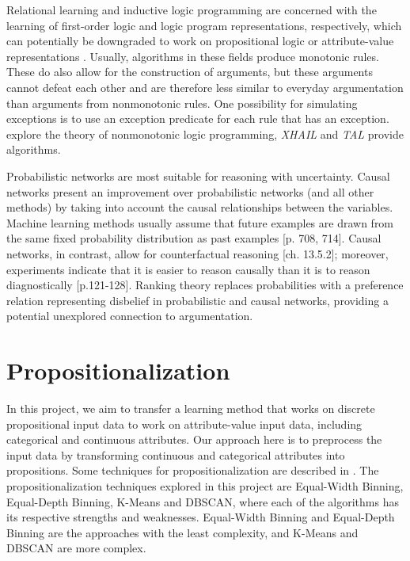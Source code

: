 Relational learning and inductive logic programming are concerned with the learning of first-order logic and logic program representations, respectively, which can potentially be downgraded to work on propositional logic or attribute-value representations \citep{deraedtLogicalRelationalLearning2008}. Usually, algorithms in these fields produce monotonic rules. These do also allow for the construction of arguments, but these arguments cannot defeat each other and are therefore less similar to everyday argumentation than arguments from nonmonotonic rules. One possibility for simulating exceptions is to use an exception predicate for each rule that has an exception. \cite{dimopoulosLearningNonmonotonicLogic1995} explore the theory of nonmonotonic logic programming, \textit{XHAIL} \citep{rayInferringProcessModels2007} and \textit{TAL} \citep{corapiInductiveLogicProgramming2010} provide algorithms.

Probabilistic networks are most suitable for reasoning with uncertainty. Causal networks present an improvement over probabilistic networks (and all other methods) by taking into account the causal relationships between the variables. Machine learning methods usually assume that future examples are drawn from the same fixed probability distribution as past examples \citep{russellArtificialIntelligenceModern2010}[p. 708, 714]. Causal networks, in contrast, allow for counterfactual reasoning \citep{russellArtificialIntelligenceModern2020}[ch. 13.5.2]; moreover, experiments indicate that it is easier to reason causally than it is to reason diagnostically \citep{kahnemanJudgmentUncertaintyHeuristics1982}[p.121-128]. Ranking theory \citep{spohnLawsBeliefRanking2012} replaces probabilities with a preference relation representing disbelief in probabilistic and causal networks, providing a potential
unexplored connection to argumentation.

\section{Propositionalization}

In this project, we aim to transfer a learning method that works on discrete propositional input data to work on attribute-value input data, including categorical and continuous attributes. Our approach here is to preprocess the input data by transforming continuous and categorical attributes into propositions. Some techniques for propositionalization are described in \cite{deraedtLogicalRelationalLearning2008}. The propositionalization techniques explored in this project are Equal-Width Binning, Equal-Depth Binning, K-Means and DBSCAN, where each of the algorithms has its respective strengths and weaknesses. Equal-Width Binning and Equal-Depth Binning are the approaches with the least complexity, and K-Means and DBSCAN are more complex.
